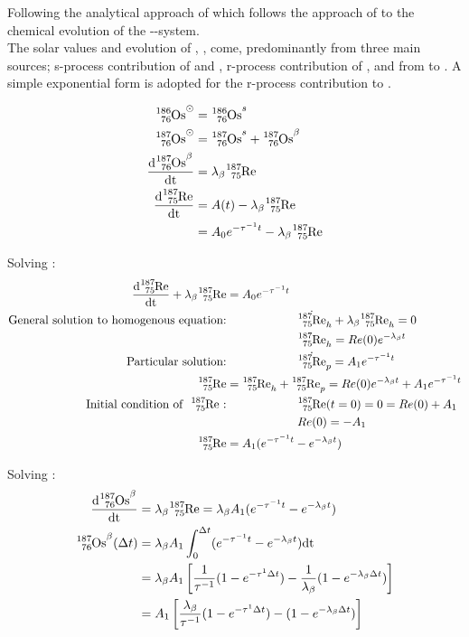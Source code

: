 
\renewcommand{\d}[1]{\frac{\textrm{d}#1}{\textrm{dt}}}

Following the analytical approach of  which follows the approach of  to the chemical evolution of the --system. \\
The solar values and evolution of , ,  come, predominantly from three main sources;
s-process contribution of  and , r-process contribution of ,
and \betadecay from  to .
A simple exponential form is adopted for the r-process contribution to .

\begin{align*}
  \os{186}^\odot &= \os{186}^s \\
  \os{187}^\odot &= \os{187}^s + \os{187}^\beta \\
  \d{\os{187}^\beta} &= \lambda_\beta\re{187} \\
  \d{\re{187}} &= A(t) - \lambda_\beta\re{187} \\
  &= A_0e^{-\tau^{-1}t} - \lambda_\beta\re{187} \\
\end{align*}

Solving :
\begin{align*}
  \d{\re{187}} + \lambda_\beta \re{187} &= A_0e^{-\tau^{-1}t} \\
  \textrm{General solution to homogenous equation:}
  & \hspace{6em} \dot{\re{187}}_h + \lambda_\beta \re{187}_h = 0 \\
  & \hspace{6em} \re{187}_h = Re(0) e^{-\lambda_\beta t} \\
  \textrm{Particular solution:}
  & \hspace{6em} \dot{\re{187}}_p = A_1 e^{-\tau^{-1}t} \\
  \re{187} &= \re{187}_h + \re{187}_p = Re(0) e^{-\lambda_\beta t} + A_1 e^{-\tau^{-1}t} \\
  \textrm{Initial condition of \re{187}:}
  & \hspace{6em} \re{187}(t=0) = 0 = Re(0) + A_1 \\
  & \hspace{6em} Re(0) = - A_1 \\
  \re{187} &= A_1 (e^{-\tau^{-1}t} - e^{-\lambda_\beta t}) \\
\end{align*}

Solving :
\begin{align*}
  \d{\os{187}^\beta} &= \lambda_\beta \re{187} = \lambda_\beta A_1 (e^{-\tau^{-1}t} - e^{-\lambda_\beta t}) \\
  \os{187}^\beta(\Delta t) &= \lambda_\beta A_1 \int_0^{\Delta t} (e^{-\tau^{-1}t} - e^{-\lambda_\beta t}) \textrm{dt} \\
  &= \lambda_\beta A_1 \left[ \frac{1}{\tau^{-1}} (1-e^{-\tau^{1}\Delta t}) - \frac{1}{\lambda_\beta} (1-e^{-\lambda_\beta \Delta t}) \right] \\
  &= A_1 \left[ \frac{\lambda_\beta}{\tau^{-1}} (1-e^{-\tau^{1}\Delta t}) - (1-e^{-\lambda_\beta \Delta t}) \right] \\
\end{align*}

